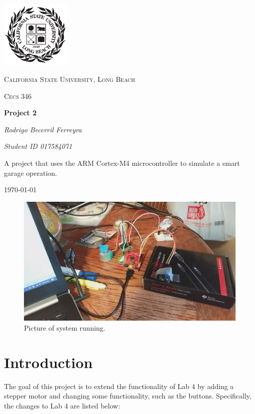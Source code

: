 \documentclass{article}
\begin{document}
\begin{titlepage}
	\centering
	\includegraphics[width=0.25\textwidth]{Images/247px-CSU-Longbeach_seal}\par\vspace{1cm}
	{\scshape\Large California State University, Long Beach \par}
	\vspace{1cm}
	{\scshape\Large Cecs 346\par}
	\vspace{1.5cm}
	{\huge\bfseries Project 2\par}
	\vspace{2cm}
    {\Large\itshape Rodrigo Becerril Ferreyra\par}
    {\itshape\Large Student ID 017584071 \par}
	\vfill
    A project that uses the ARM Cortex-M4 microcontroller to
    simulate a smart garage operation.

	\vfill

	{\large \today\par}
\end{titlepage}

\begin{figure}[H]
    \centering
    \includegraphics[width=\textwidth]{Images/image}
    \caption{Picture of system running.}
    \label{system}
\end{figure}

\section{Introduction} The goal of this project is to
extend the functionality of Lab 4 by adding a
stepper motor and changing some functionality, such as the
buttons. Specifically, the changes to Lab 4 are listed
below:
\end{document}
